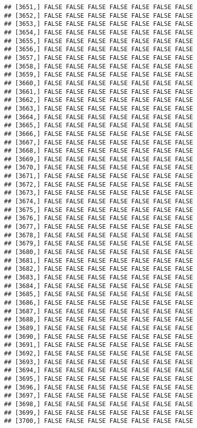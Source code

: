 \documentclass[
]{article}
\begin{document}
\begin{verbatim}
## [3651,] FALSE FALSE FALSE FALSE FALSE FALSE FALSE
## [3652,] FALSE FALSE FALSE FALSE FALSE FALSE FALSE
## [3653,] FALSE FALSE FALSE FALSE FALSE FALSE FALSE
## [3654,] FALSE FALSE FALSE FALSE FALSE FALSE FALSE
## [3655,] FALSE FALSE FALSE FALSE FALSE FALSE FALSE
## [3656,] FALSE FALSE FALSE FALSE FALSE FALSE FALSE
## [3657,] FALSE FALSE FALSE FALSE FALSE FALSE FALSE
## [3658,] FALSE FALSE FALSE FALSE FALSE FALSE FALSE
## [3659,] FALSE FALSE FALSE FALSE FALSE FALSE FALSE
## [3660,] FALSE FALSE FALSE FALSE FALSE FALSE FALSE
## [3661,] FALSE FALSE FALSE FALSE FALSE FALSE FALSE
## [3662,] FALSE FALSE FALSE FALSE FALSE FALSE FALSE
## [3663,] FALSE FALSE FALSE FALSE FALSE FALSE FALSE
## [3664,] FALSE FALSE FALSE FALSE FALSE FALSE FALSE
## [3665,] FALSE FALSE FALSE FALSE FALSE FALSE FALSE
## [3666,] FALSE FALSE FALSE FALSE FALSE FALSE FALSE
## [3667,] FALSE FALSE FALSE FALSE FALSE FALSE FALSE
## [3668,] FALSE FALSE FALSE FALSE FALSE FALSE FALSE
## [3669,] FALSE FALSE FALSE FALSE FALSE FALSE FALSE
## [3670,] FALSE FALSE FALSE FALSE FALSE FALSE FALSE
## [3671,] FALSE FALSE FALSE FALSE FALSE FALSE FALSE
## [3672,] FALSE FALSE FALSE FALSE FALSE FALSE FALSE
## [3673,] FALSE FALSE FALSE FALSE FALSE FALSE FALSE
## [3674,] FALSE FALSE FALSE FALSE FALSE FALSE FALSE
## [3675,] FALSE FALSE FALSE FALSE FALSE FALSE FALSE
## [3676,] FALSE FALSE FALSE FALSE FALSE FALSE FALSE
## [3677,] FALSE FALSE FALSE FALSE FALSE FALSE FALSE
## [3678,] FALSE FALSE FALSE FALSE FALSE FALSE FALSE
## [3679,] FALSE FALSE FALSE FALSE FALSE FALSE FALSE
## [3680,] FALSE FALSE FALSE FALSE FALSE FALSE FALSE
## [3681,] FALSE FALSE FALSE FALSE FALSE FALSE FALSE
## [3682,] FALSE FALSE FALSE FALSE FALSE FALSE FALSE
## [3683,] FALSE FALSE FALSE FALSE FALSE FALSE FALSE
## [3684,] FALSE FALSE FALSE FALSE FALSE FALSE FALSE
## [3685,] FALSE FALSE FALSE FALSE FALSE FALSE FALSE
## [3686,] FALSE FALSE FALSE FALSE FALSE FALSE FALSE
## [3687,] FALSE FALSE FALSE FALSE FALSE FALSE FALSE
## [3688,] FALSE FALSE FALSE FALSE FALSE FALSE FALSE
## [3689,] FALSE FALSE FALSE FALSE FALSE FALSE FALSE
## [3690,] FALSE FALSE FALSE FALSE FALSE FALSE FALSE
## [3691,] FALSE FALSE FALSE FALSE FALSE FALSE FALSE
## [3692,] FALSE FALSE FALSE FALSE FALSE FALSE FALSE
## [3693,] FALSE FALSE FALSE FALSE FALSE FALSE FALSE
## [3694,] FALSE FALSE FALSE FALSE FALSE FALSE FALSE
## [3695,] FALSE FALSE FALSE FALSE FALSE FALSE FALSE
## [3696,] FALSE FALSE FALSE FALSE FALSE FALSE FALSE
## [3697,] FALSE FALSE FALSE FALSE FALSE FALSE FALSE
## [3698,] FALSE FALSE FALSE FALSE FALSE FALSE FALSE
## [3699,] FALSE FALSE FALSE FALSE FALSE FALSE FALSE
## [3700,] FALSE FALSE FALSE FALSE FALSE FALSE FALSE

\end{verbatim}
\end{document}
